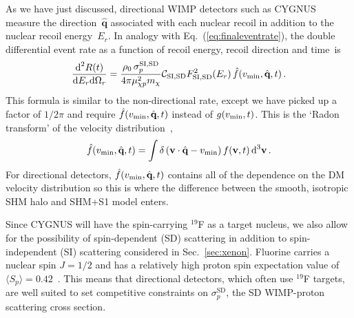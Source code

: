 \documentclass[prd,10pt,twocolumn,showpacs,nofootinbib,aps,superscriptaddress,preprintnumbers]{revtex4-1}
\newcommand{\vmin}{v_{\rm min}}
\begin{document}
As we have just discussed, directional WIMP detectors such as CYGNUS measure
the direction~$\hat{\textbf{q}}$ associated with each nuclear recoil in addition to the nuclear recoil energy~$E_r$.
In analogy with Eq.~(\ref{eq:finaleventrate}), the double
differential event rate as a function of recoil energy, recoil direction and time~is
%
\begin{equation}\label{eq:finaleventrate-directional}
 \frac{\textrm{d}^2R(t)}{\textrm{d}E_r\textrm{d}\Omega_r} = \frac{\rho_0\,\sigma^{\rm SI,SD}_p}{4\pi\mu_{\chi p}^2 m_\chi}  \mathcal{C}_{\textrm{SI,SD}} F^2_{\rm SI,SD}(E_r) \, \hat{f}(\vmin,\hat{\textbf{q}},t) \, .
\end{equation}
%
This formula is similar to the non-directional rate, except we have
picked up a factor of $1/2\pi$ and require
$\hat{f}(\vmin,\hat{\textbf{q}},t)$ instead of $g(\vmin,t)$. This is
the `Radon transform' of the velocity
distribution~\cite{Gondolo:2002np,Radon},
%
\begin{equation}
 \hat{f}(\vmin,\hat{\textbf{q}},t) = \int \delta\left(\textbf{v} \cdot \hat{\textbf{q}} - \vmin\right) f(\textbf{v},t)\, \textrm{d}^3 \textbf{v}\, .
\end{equation}
%
For directional detectors, $\hat{f}(\vmin,\hat{\textbf{q}},t)$ contains all of the dependence
on the DM velocity distribution so this is where the difference between the smooth, isotropic SHM halo
and SHM+S1 model enters.

Since CYGNUS will have the spin-carrying $^{19}$F as a target nucleus, we also allow for the possibility of spin-dependent (SD) scattering in addition to spin-independent (SI) scattering considered in Sec.~\ref{sec:xenon}.
Fluorine carries a nuclear spin $J = 1/2$ and has a relatively high proton spin expectation value of $\langle S_p \rangle  = 0.42$~\cite{Cannoni:2012jq}.
This means that directional detectors, which often use $^{19}$F targets, are well suited to set competitive constraints on $\sigma_p^{\mathrm{SD}}$, the SD WIMP-proton scattering cross section. 
\end{document}
